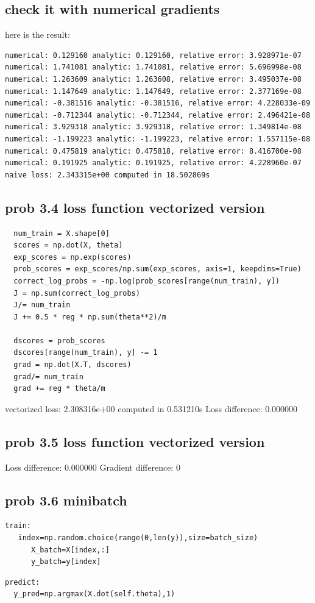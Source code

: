 \documentclass[pdftex,11pt]{article}
\begin{document}
\subsection{check it with numerical gradients}
here is the result:
\begin{lstlisting} 
numerical: 0.129160 analytic: 0.129160, relative error: 3.928971e-07
numerical: 1.741081 analytic: 1.741081, relative error: 5.696998e-08
numerical: 1.263609 analytic: 1.263608, relative error: 3.495037e-08
numerical: 1.147649 analytic: 1.147649, relative error: 2.377169e-08
numerical: -0.381516 analytic: -0.381516, relative error: 4.228033e-09
numerical: -0.712344 analytic: -0.712344, relative error: 2.496421e-08
numerical: 3.929318 analytic: 3.929318, relative error: 1.349814e-08
numerical: -1.199223 analytic: -1.199223, relative error: 1.557115e-08
numerical: 0.475819 analytic: 0.475818, relative error: 8.416700e-08
numerical: 0.191925 analytic: 0.191925, relative error: 4.228960e-07
naive loss: 2.343315e+00 computed in 18.502869s\end{lstlisting} 


\subsection{prob 3.4 loss function vectorized version}
\begin{lstlisting} 
  num_train = X.shape[0]
  scores = np.dot(X, theta)
  exp_scores = np.exp(scores)
  prob_scores = exp_scores/np.sum(exp_scores, axis=1, keepdims=True)
  correct_log_probs = -np.log(prob_scores[range(num_train), y])
  J = np.sum(correct_log_probs)
  J/= num_train
  J += 0.5 * reg * np.sum(theta**2)/m

  dscores = prob_scores
  dscores[range(num_train), y] -= 1
  grad = np.dot(X.T, dscores)
  grad/= num_train
  grad += reg * theta/m
\end{lstlisting} 
vectorized loss: 2.308316e+00 computed in 0.531210s
Loss difference: 0.000000
\subsection{prob 3.5 loss function vectorized version}
Loss difference: 0.000000
Gradient difference: 0
\subsection{prob 3.6 minibatch}
\begin{lstlisting} 
train:
   index=np.random.choice(range(0,len(y)),size=batch_size)
      X_batch=X[index,:]
      y_batch=y[index]
\end{lstlisting} 
\begin{lstlisting} 
predict:
  y_pred=np.argmax(X.dot(self.theta),1)
\end{lstlisting} 
\end{document}
